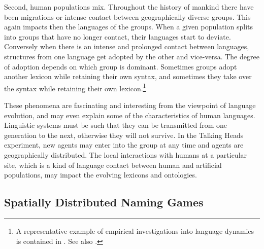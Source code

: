 Second, human populations mix. Throughout the history of 
mankind there have been migrations or intense contact 
between geographically diverse groups. This again impacts
then the languages of the groups. 
When a given population splits into groups that have no longer 
contact, their languages start to deviate. Conversely
when there is an intense and prolonged contact between languages, 
structures from one language get adopted by the other
and vice-versa. The degree of adoption depends on which 
group is dominant. Sometimes groups adopt
another lexicon while retaining their own
syntax, and sometimes they take over the syntax
while retaining their own lexicon.\footnote{
A representative example of empirical investigations into 
language dynamics is contained in \cite{Nichols:1992}. 
See also \cite{Romaine:1988}.}

These phenomena are fascinating and interesting from the viewpoint
of language evolution, and may even explain some of the characteristics
of human languages. Linguistic systems must be 
such that they can be transmitted from one generation to the next,
otherwise they will not survive. 
In the Talking Heads experiment,
new agents may enter into the group at
any time and agents are geographically distributed. 
The local interactions 
with humans at a particular site, which is a kind of language
contact between human and artificial populations, may 
impact the evolving lexicons and ontologies. 

\subsection{Spatially Distributed Naming Games}

